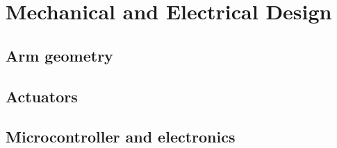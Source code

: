\chapter{Mechanical and Electrical Design}
\label{ch:hardware}

\section{Arm geometry}

\section{Actuators}

\section{Microcontroller and electronics}
